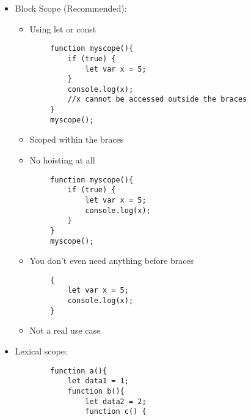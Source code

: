 \documentclass{article}
\begin{document}
\begin{itemize}
\begin{lstlisting}
            console.log(x);
        }
        myscope();
        //doesnt work
    \end{lstlisting}
    \begin{itemize}
        \item Variables defined in function scope have preprocessing 
        \item Moves the declaration to the top of the function
        \item The variable is accessable anywhere within the function
    \end{itemize}
    \item Block Scope (Recommended):
    \begin{itemize}
        \item Using let or const
    \end{itemize}
    \begin{lstlisting}
        function myscope(){
            if (true) {
                let var x = 5;
            }
            console.log(x);
            //x cannot be accessed outside the braces 
        }
        myscope();
    \end{lstlisting}
    \begin{itemize}
        \item Scoped within the braces 
        \item No hoisting at all
    \end{itemize}
    \begin{lstlisting}
        function myscope(){
            if (true) {
                let var x = 5;
                console.log(x);
            }
        }
        myscope();
    \end{lstlisting}
    \begin{itemize}
        \item You don't even need anything before braces
    \end{itemize}
    \begin{lstlisting}
        {
            let var x = 5;
            console.log(x);
        }
    \end{lstlisting}
    \begin{itemize}
        \item Not a real use case
    \end{itemize}
    \item Lexical scope:
    \begin{lstlisting}
        function a(){
            let data1 = 1;
            function b(){
                let data2 = 2;
                function c() {

\end{lstlisting}
\end{itemize}
\end{document}

